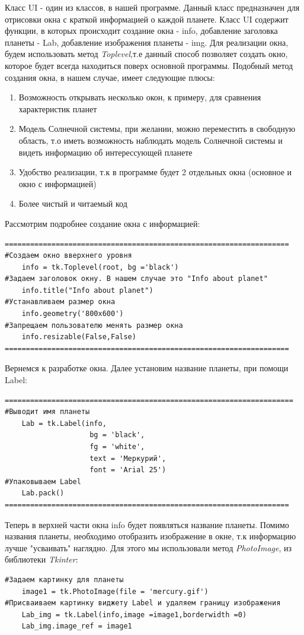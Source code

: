 \documentclass[11pt,a4paper]{report}
\begin{document}
Класс UI - один из классов, в нашей программе. Данный класс предназначен для отрисовки окна с краткой информацией о каждой планете.
Класс UI содержит функции, в которых происходит создание окна  - info, добавление заголовка планеты - Lab, добавление изображения планеты - img. 
Для реализации окна, будем использовать метод \textit{Toplevel},т.е данный способ позволяет создать окно, которое будет всегда находиться поверх основной программы. 
Подобный метод создания окна, в нашем случае, имеет следующие плюсы:
\begin{enumerate}
    \item Возможность открывать несколько окон, к примеру, для сравнения характеристик планет
    \item Модель Солнечной системы, при желании, можно переместить в свободную область, т.о иметь возможность наблюдать модель Солнечной системы и видеть информацию об интерессующей планете
    \item Удобство реализации, т.к в программе будет 2 отдельных окна (основное и окно с информацией)
    \item Более чистый и читаемый код
\end{enumerate}
Рассмотрим подробнее создание окна с информацией:
\begin{verbatim}
===================================================================
#Создаем окно вверхнего уровня
    info = tk.Toplevel(root, bg ='black')
#Задаем заголовок окну. В нашем случае это "Info about planet"
    info.title("Info about planet")
#Устанавливаем размер окна
    info.geometry('800x600')
#Запрещаем пользователю менять размер окна
    info.resizable(False,False)
===================================================================
\end{verbatim}
Вернемся к разработке окна.
Далее установим название планеты, при помощи Label:
\begin{verbatim}
====================================================================
#Выводит имя планеты
    Lab = tk.Label(info,
                    bg = 'black',
                    fg = 'white',
                    text = 'Меркурий', 
                    font = 'Arial 25')
#Упаковываем Label
    Lab.pack()
===================================================================
\end{verbatim}
Теперь в верхней части окна info будет появляться  название планеты.
Помимо названия планеты, необходимо отобразить изображение в окне, т.к информацию лучше "усваивать" наглядно.
Для этого мы использовали метод \textit{PhotoImage}, из библиотеки \textit{Tkinter}:
\begin{verbatim}
#Задаем картинку для планеты
    image1 = tk.PhotoImage(file = 'mercury.gif')
#Присваиваем картинку виджету Label и удаляем границу изображения
    Lab_img = tk.Label(info,image =image1,borderwidth =0)
    Lab_img.image_ref = image1
\end{verbatim}
\end{document}
